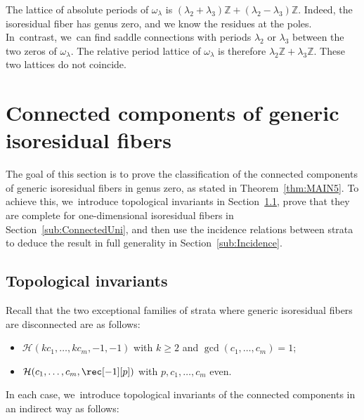 \begin{rmk}
The lattice of absolute periods of $\omega_{\lambda}$ is $(\lambda_{2}+\lambda_{3})\mathbb{Z}+(\lambda_{2}-\lambda_{3})\mathbb{Z}$. Indeed, the isoresidual fiber has genus zero, and we know the residues at the poles. In~contrast, we~can find saddle connections with periods $\lambda_{2}$ or $\lambda_{3}$ between the two zeros of $\omega_{\lambda}$. The relative period lattice of $\omega_{\lambda}$ is therefore $\lambda_{2}\mathbb{Z}+\lambda_{3}\mathbb{Z}$. These two lattices do not coincide.
\end{rmk}

\section{Connected components of generic isoresidual fibers}\label{sec:Connected}

The goal of this section is to prove the classification of the connected components of generic isoresidual fibers in genus zero, as stated in Theorem~\ref{thm:MAIN5}. To achieve this, we~introduce topological invariants in Section~\ref{sub:ConnectedInvariant}, prove that they are complete for one-dimensional isoresidual fibers in Section~\ref{sub:ConnectedUni}, and then use the incidence relations between strata to deduce the result in full generality in Section~\ref{sub:Incidence}.

\subsection{Topological invariants}\label{sub:ConnectedInvariant}

Recall that the two exceptional families of strata where generic isoresidual fibers are disconnected are as follows:
\begin{itemize}
\item $\mathcal{H}(kc_{1},\dots,kc_{m},-1,-1)$ with $k \geq 2$ and $\gcd(c_{1},\dots,c_{m})=1$;
\item $\mathcal{H}(c_{1},\dots,c_{m},\rec[-1][p])$ with $p,c_{1},\dots,c_{m}$ even.
\end{itemize}
In each case, we~introduce topological invariants of the connected components in an indirect way as follows:

